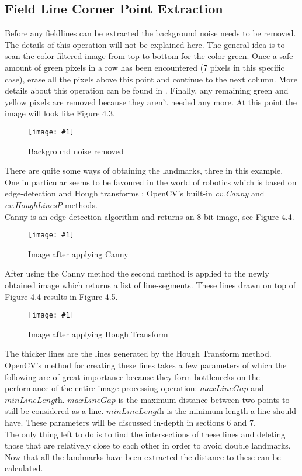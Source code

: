 \documentclass{ba-kecs}
\numberwithin{figure}{section}
\numberwithin{equation}{section}
\newcommand{\dkepic}[2]{ %
	\begin{figure}[H] %
	\texttt{[image: \#1]}
	\caption{#2}
	\label{#1}
	\end{figure}
}
\begin{document}
{\subsection{Field Line Corner Point Extraction} 
Before any fieldlines can be extracted the background noise needs to be removed. The details of this operation will not be explained here. The general idea is to scan the color-filtered image from top to bottom for the color green. Once a safe amount of green pixels in a row has been encountered (7 pixels in this specific case), erase all the pixels above this point and continue to the next column. More details about this operation can be found in \cite{ref1}. Finally, any remaining green and yellow pixels are removed because they aren't needed any more. At this point the image will look like Figure 4.3.\\
\dkepic{figure_IP3}{Background noise removed}
There are quite some ways of obtaining the landmarks, three in this example. One in particular seems to be favoured in the world of robotics which is based on edge-detection and Hough transforms \cite{ref2}\cite{ref3}: OpenCV's built-in \emph{cv.Canny} and \emph{cv.HoughLinesP} methods. \\
Canny is an edge-detection algorithm and returns an 8-bit image, see Figure 4.4.\\
\dkepic{figure_IP4}{Image after applying Canny}
After using the Canny method the second method is applied to the newly obtained image which returns a list of line-segments. These lines drawn on top of Figure 4.4 results in Figure 4.5.\\
\dkepic{figure_IP5}{Image after applying Hough Transform}
The thicker lines are the lines generated by the Hough Transform method.
OpenCV's method for creating these lines takes a few parameters of which the following are of great importance because they form bottlenecks on the performance of the entire image processing operation: $\textit{maxLineGap}$ and $\textit{minLineLength}$. $\textit{maxLineGap}$ is the maximum distance between two points to still be considered as a line. $\textit{minLineLength}$ is the minimum length a line should have. These parameters will be discussed in-depth in sections 6 and 7. \\
The only thing left to do is to find the intersections of these lines and deleting those that are relatively close to each other in order to avoid double landmarks. \\
Now that all the landmarks have been extracted the distance to these can be calculated. 


}
\end{document}
